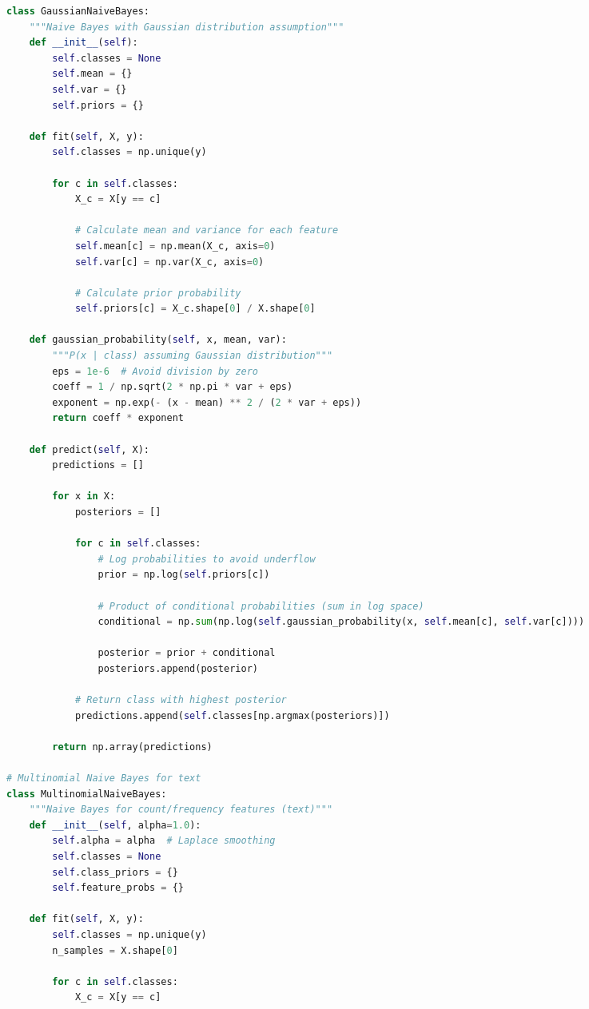 \documentclass[8pt,landscape]{article}
\begin{document}
\begin{multicols}{3}
\begin{lstlisting}[language=Python]
class GaussianNaiveBayes:
    """Naive Bayes with Gaussian distribution assumption"""
    def __init__(self):
        self.classes = None
        self.mean = {}
        self.var = {}
        self.priors = {}

    def fit(self, X, y):
        self.classes = np.unique(y)

        for c in self.classes:
            X_c = X[y == c]

            # Calculate mean and variance for each feature
            self.mean[c] = np.mean(X_c, axis=0)
            self.var[c] = np.var(X_c, axis=0)

            # Calculate prior probability
            self.priors[c] = X_c.shape[0] / X.shape[0]

    def gaussian_probability(self, x, mean, var):
        """P(x | class) assuming Gaussian distribution"""
        eps = 1e-6  # Avoid division by zero
        coeff = 1 / np.sqrt(2 * np.pi * var + eps)
        exponent = np.exp(- (x - mean) ** 2 / (2 * var + eps))
        return coeff * exponent

    def predict(self, X):
        predictions = []

        for x in X:
            posteriors = []

            for c in self.classes:
                # Log probabilities to avoid underflow
                prior = np.log(self.priors[c])

                # Product of conditional probabilities (sum in log space)
                conditional = np.sum(np.log(self.gaussian_probability(x, self.mean[c], self.var[c])))

                posterior = prior + conditional
                posteriors.append(posterior)

            # Return class with highest posterior
            predictions.append(self.classes[np.argmax(posteriors)])

        return np.array(predictions)

# Multinomial Naive Bayes for text
class MultinomialNaiveBayes:
    """Naive Bayes for count/frequency features (text)"""
    def __init__(self, alpha=1.0):
        self.alpha = alpha  # Laplace smoothing
        self.classes = None
        self.class_priors = {}
        self.feature_probs = {}

    def fit(self, X, y):
        self.classes = np.unique(y)
        n_samples = X.shape[0]

        for c in self.classes:
            X_c = X[y == c]


\end{lstlisting}
\end{multicols}
\end{document}
